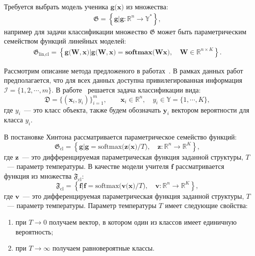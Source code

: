 Требуется выбрать модель ученика $\mathbf{g}\bigr(\mathbf{x}\bigr)$ из множества:
\[
\label{eq:st:G}
\begin{aligned}
\mathfrak{G} = \left\{\mathbf{g}| \mathbf{g}:\mathbb{R}^{n} \to \mathbb{Y}^*\right\},
\end{aligned}
\]
например для задачи классификации множество $\mathfrak{G}$ может быть параметрическим семейством функций линейных моделей:
\[
\label{eq:st:G:lin:cl}
\begin{aligned}
\mathfrak{G}_\text{lin,cl} = \left\{\mathbf{g}\bigr(\mathbf{W}, \mathbf{x}\bigr)| \mathbf{g}\bigr(\mathbf{W}, \mathbf{x}\bigr) = \textbf{softmax}\bigr(\mathbf{W}\mathbf{x}\bigr), \quad \mathbf{W} \in \mathbb{R}^{n\times K}\right\}.
\end{aligned}
\]

Рассмотрим описание метода предложеного в работах~\cite{Hinton2015, Lopez2016}. В рамках данных работ предполагается, что для всех данных доступна привилегированная информация $\mathcal{I} = \{1, 2, \cdots, m\}$. В работе~\cite{Hinton2015} решается задача классификации вида:
\[
    \mathfrak{D} = \{\left(\mathbf{x}_i, y_i\right)\}_{i=1}^{m}, \qquad \mathbf{x}_i \in \mathbb{R}^{n}, \quad y_i \in \mathbb{Y}=\{1, \cdots, K\},
\]
где $y_i$~--- это класс объекта, также будем обозначать $\mathbf{y}_i$ вектором вероятности для класса $y_i$.

В постановке Хинтона рассматривается параметрическое семейство функций:
\[
\label{eq:G:set:cl}
\mathfrak{G}_{\text{cl}} = \left\{\mathbf{g}| \mathbf{g} = \text{softmax}\bigr(\mathbf{z}\bigr(\mathbf{x}\bigr)/T\bigr), \quad \mathbf{z}: \mathbb{R}^n \to \mathbb{R}^K \right\},
\]
где $\mathbf{z}$~--- это дифференцируемая параметрическая функция заданной структуры, $T$~--- параметр температуры. В качестве модели учителя $\mathbf{f}$ рассматривается функция из множества $\mathfrak{F}_{\text{cl}}$:
\[
\label{eq:F:set:cl}
\mathfrak{F}_{\text{cl}} = \left\{\mathbf{f}| \mathbf{f} = \text{softmax}\bigr(\mathbf{v}\bigr(\mathbf{x}\bigr)/T\bigr), \quad \mathbf{v}: \mathbb{R}^n \to \mathbb{R}^K \right\},
\]
где $\mathbf{v}$~--- это дифференцируемая параметрическая функция заданной структуры, $T$~--- параметр температуры.
Параметр температуры $T$ имеет следующие свойства:
\begin{enumerate}
    \item при $T\to 0$ получаем вектор, в котором один из классов имеет единичную вероятность;
    \item при $T\to \infty$ получаем равновероятные классы.
\end{enumerate}

